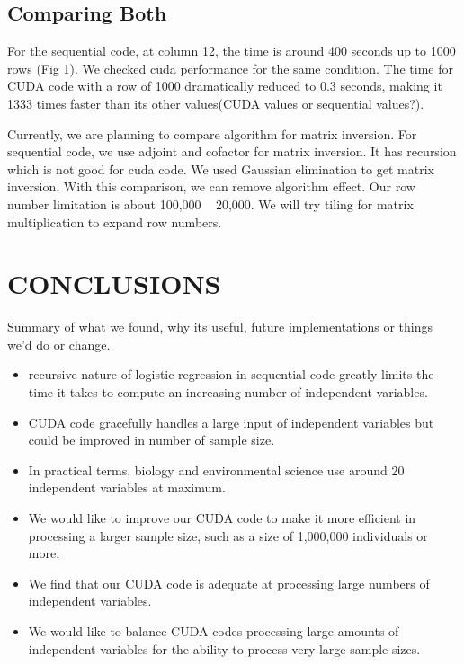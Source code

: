 \documentclass[letterpaper, 10 pt, conference]{ieeeconf}  %
\begin{document}
\subsection{Comparing Both}

For the sequential code, at column 12, the time is around 400 seconds up to 1000 rows (Fig 1). We checked cuda performance for the same condition. The time for CUDA code with a row of 1000 dramatically reduced to 0.3 seconds, making it 1333 times faster than its other values(CUDA values or sequential values?). 

Currently, we are planning to compare algorithm for matrix inversion. For sequential code, we use adjoint and cofactor for matrix inversion. It has recursion which is not good for cuda code. We used Gaussian elimination to get matrix inversion. With this comparison, we can remove algorithm effect. Our row number limitation is about 100,000 ~ 20,000. We will try tiling for matrix multiplication to expand row numbers.  


\section{CONCLUSIONS}

Summary of what we found, why its useful, future implementations or things we'd do or change.

\begin{itemize}

\item recursive nature of logistic regression in sequential code greatly limits the time it takes to compute an increasing number of independent variables. 
\item CUDA code gracefully handles a large input of independent variables but could be improved in number of sample size.
\item In practical terms, biology and environmental science use around 20 independent variables at maximum.
\item We would like to improve our CUDA code to make it more efficient in processing a larger sample size, such as a size of 1,000,000 individuals or more.
\item We find that our CUDA code is adequate at processing large numbers of independent variables.
\item We would like to balance CUDA codes processing large amounts of independent variables for the ability to process very large sample sizes.
\end{itemize}
\end{document}
